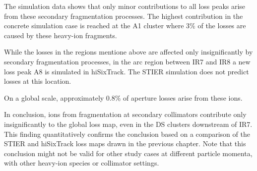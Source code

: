 The simulation data shows that only minor contributions to all loss peaks arise from these secondary fragmentation processes. The highest contribution in the concrete simulation case is reached at the A1 cluster where 3\% of the losses are caused by these heavy-ion fragments. 

While the losses in the regions mentione above are affected only insignificantly by secondary fragmentation processes, in the arc region between IR7 and IR8 a new loss peak A8 is simulated in hiSixTrack. The STIER simulation does not predict losses at this location. 



On a global scale, approximately 0.8\% of aperture losses arise from these ions. 



In conclusion, ions from fragmentation at secondary collimators contribute only insignificantly to the global loss map, even in the DS clusters downstream of IR7. This finding quantitatively confirms the conclusion based on a comparison of the STIER and hiSixTrack loss maps drawn in the previous chapter. Note that this conclusion might not be valid for other study cases at different particle momenta, with other heavy-ion species or collimator settings.